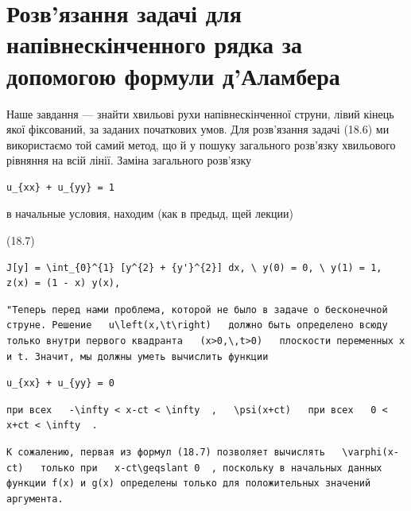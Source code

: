 \documentclass[
  ukrainian,
]{article}
\begin{document}
\section{Розв'язання задачі для напівнескінченного рядка за допомогою
формули
д'Аламбера}\label{ux440ux43eux437ux432ux44fux437ux430ux43dux43dux44f-ux437ux430ux434ux430ux447ux456-ux434ux43bux44f-ux43dux430ux43fux456ux432ux43dux435ux441ux43aux456ux43dux447ux435ux43dux43dux43eux433ux43e-ux440ux44fux434ux43aux430-ux437ux430-ux434ux43eux43fux43eux43cux43eux433ux43eux44e-ux444ux43eux440ux43cux443ux43bux438-ux434ux430ux43bux430ux43cux431ux435ux440ux430}

Наше завдання --- знайти хвильові рухи напівнескінченної струни, лівий
кінець якої фіксований, за заданих початкових умов. Для розв'язання
задачі (18.6) ми використаємо той самий метод, що й у пошуку загального
розв'язку хвильового рівняння на всій лінії. Заміна загального розв'язку

\begin{verbatim}
u_{xx} + u_{yy} = 1
\end{verbatim}

в начальные условия, находим (как в предыд, щей лекции)

(18.7)

\begin{verbatim}
J[y] = \int_{0}^{1} [y^{2} + {y'}^{2}] dx, \ y(0) = 0, \ y(1) = 1,
z(x) = (1 - x) y(x),
\end{verbatim}

\begin{verbatim}
"Теперь перед нами проблема, которой не было в задаче о бесконечной струне. Решение   u\left(x,\t\right)   должно быть определено всюду только внутри первого квадранта   (x>0,\,t>0)   плоскости переменных x и t. Значит, мы должны уметь вычислить функции
\end{verbatim}

\begin{verbatim}
u_{xx} + u_{yy} = 0
\end{verbatim}

\begin{verbatim}
при всех   -\infty < x-ct < \infty  ,   \psi(x+ct)   при всех   0 < x+ct < \infty  .
\end{verbatim}

\begin{verbatim}
К сожалению, первая из формул (18.7) позволяет вычислять   \varphi(x-ct)   только при   x-ct\geqslant 0  , поскольку в начальных данных функции f(x) и g(x) определены только для положительных значений аргумента.
\end{verbatim}
\end{document}
